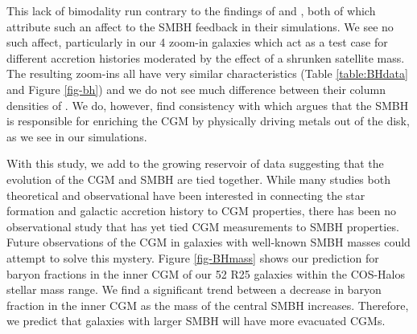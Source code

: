 \documentclass[]{emulateapj}
\begin{document}
This lack of bimodality run contrary to the findings of \cite{Suresh2017} and \cite{Nelson2018}, both of which attribute such an affect to the SMBH feedback in their simulations. We see no such affect, particularly in our 4 zoom-in galaxies which act as a test case for different accretion histories moderated by the effect of a shrunken satellite mass. The resulting zoom-ins all have very similar characteristics (Table \ref{table:BHdata} and Figure \ref{fig-bh}) and we do not see much difference between their column densities of . We do, however, find consistency with \cite{Nelson2018} which argues that the SMBH is responsible for enriching the CGM by physically driving metals out of the disk, as we see in our simulations. 

With this study, we add to the growing reservoir of data suggesting that the evolution of the CGM and SMBH are tied together. While many studies both theoretical and observational have been interested in connecting the star formation and galactic accretion history to CGM properties, there has been no observational study that has yet tied CGM measurements to SMBH properties. Future observations of the CGM in galaxies with well-known SMBH masses could attempt to solve this mystery. Figure \ref{fig-BHmass} shows our prediction for baryon fractions in the inner CGM of our 52 R25 galaxies within the COS-Halos stellar mass range. We find a significant trend between a decrease in baryon fraction in the inner CGM as the mass of the central SMBH increases. Therefore, we predict that galaxies with larger SMBH will have more evacuated CGMs.





\end{document}
